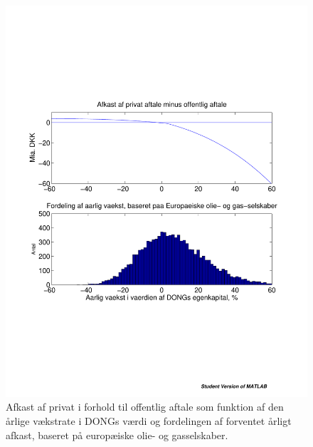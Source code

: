 \documentclass{article}
\begin{document}
\begin{figure}
\includegraphics[scale=0.8]{../matlab/figs/afkast_hist_combine_oilgas}
\caption{Afkast af privat i forhold til offentlig aftale som funktion af den \aa{}rlige v\ae{}kstrate i DONGs v\ae{}rdi og fordelingen af forventet \aa{}rligt afkast, baseret p\aa{} europ\ae{}iske olie- og gasselskaber.}
\label{fig:combine2}
\end{figure}
\end{document}
